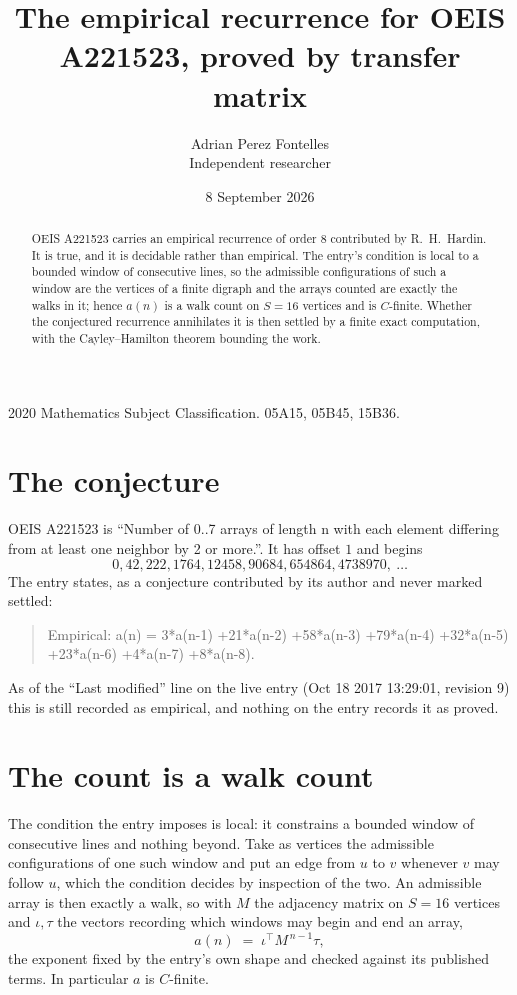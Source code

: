\documentclass[11pt,a4paper]{article}
\title{The empirical recurrence for OEIS A221523, proved by transfer matrix}
\author{Adrian Perez Fontelles\\ \small Independent researcher}
\date{8 September 2026}
\theoremstyle{plain}
\theoremstyle{definition}
\begin{document}
\maketitle

\begin{abstract}
OEIS A221523 carries an empirical recurrence of order $8$ contributed by R.~H.~Hardin. It is
true, and it is decidable rather than empirical. The entry's condition is local to a bounded window of consecutive lines, so
the admissible configurations of such a window are the vertices of a finite digraph and the
arrays counted are exactly the walks in it; hence $a(n)$ is a walk count on $S=16$ vertices
and is $C$-finite. Whether the conjectured recurrence annihilates it is then settled by a
finite exact computation, with the Cayley--Hamilton theorem bounding the work.
\end{abstract}

\noindent\small 2020 Mathematics Subject Classification. 05A15, 05B45, 15B36.\normalsize

\section{The conjecture}

OEIS A221523 is ``Number of 0..7 arrays of length n with each element differing from at least one neighbor by 2 or more.''. It has offset $1$ and begins
\[
0, 42, 222, 1764, 12458, 90684, 654864, 4738970,\ \dots
\]
The entry states, as a conjecture contributed by its author and never marked settled:
\begin{quote}
Empirical: a(n) = 3*a(n-1) +21*a(n-2) +58*a(n-3) +79*a(n-4) +32*a(n-5) +23*a(n-6) +4*a(n-7) +8*a(n-8).
\end{quote}
As of the ``Last modified'' line on the live entry (Oct 18 2017 13:29:01, revision 9) this is still
recorded as empirical, and nothing on the entry records it as proved.

\section{The count is a walk count}

The condition the entry imposes is local: it constrains a bounded window of consecutive lines and nothing beyond. Take as
vertices the admissible configurations of one such window and put an edge from $u$ to $v$
whenever $v$ may follow $u$, which the condition decides by inspection of the two. An
admissible array is then exactly a walk, so with $M$ the adjacency matrix on $S=16$ vertices
and $\iota,\tau$ the vectors recording which windows may begin and end an array,
\[
a(n)\;=\;\iota^{\!\top}M^{\,n-1}\tau ,
\]
the exponent fixed by the entry's own shape and checked against its published terms. In
particular $a$ is $C$-finite.
\end{document}
